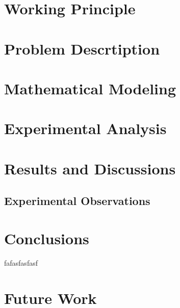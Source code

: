 \documentclass[a4paper,twoside,12pt]{article}
\begin{document}
\section{Working Principle}

\section{Problem Descrtiption}


\section{Mathematical Modeling}


\section{Experimental Analysis}


\section{Results and Discussions}


\subsection{Experimental Observations}



\section{Conclusions}
fafasfasfasf
\section{Future Work}





%
%
\end{document}
